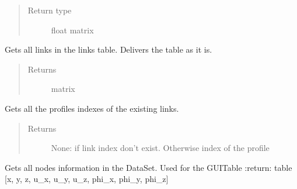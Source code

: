 \documentclass[letterpaper,10pt,english]{sphinxmanual}
\begin{document}
\begin{fulllineitems}
\begin{fulllineitems}
\begin{quote}
\begin{description}
\item[{Return type}] \leavevmode
float matrix

\end{description}\end{quote}

\end{fulllineitems}


\begin{fulllineitems}
\label{\detokenize{api:beamon.database.Database.get_all_links}}
Gets all links in the links table.
Delivers the table as it is.
\begin{quote}\begin{description}
\item[{Returns}] \leavevmode
matrix

\end{description}\end{quote}

\end{fulllineitems}


\begin{fulllineitems}
\label{\detokenize{api:beamon.database.Database.get_all_links_profile_indexes}}
Gets all the profiles indexes of the existing links.
\begin{quote}\begin{description}
\item[{Returns}] \leavevmode
None: if link index don’t exist. Otherwise index of the profile

\end{description}\end{quote}

\end{fulllineitems}


\begin{fulllineitems}
\label{\detokenize{api:beamon.database.Database.get_all_nodes}}
Gets all nodes information in the DataSet. Used for the GUI\sphinxhyphen{}Table
:return: table {[}x, y, z, u\_x, u\_y, u\_z, phi\_x, phi\_y, phi\_z{]}


\end{fulllineitems}
\end{fulllineitems}
\end{document}
